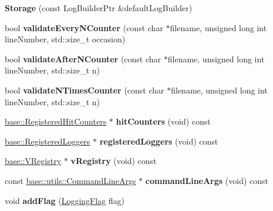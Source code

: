 \begin{DoxyCompactItemize}
\item 
\hypertarget{a00086_a4932a8f8a55c3b00467cf2feed6acf59}{}{\bfseries Storage} (const Log\+Builder\+Ptr \&default\+Log\+Builder)\label{a00086_a4932a8f8a55c3b00467cf2feed6acf59}

\item 
\hypertarget{a00086_ae99093b82b3f25b6baf5d3d8b00b27e5}{}bool {\bfseries validate\+Every\+N\+Counter} (const char $\ast$filename, unsigned long int line\+Number, std\+::size\+\_\+t occasion)\label{a00086_ae99093b82b3f25b6baf5d3d8b00b27e5}

\item 
\hypertarget{a00086_ad93b7ae53a58a57b85db2dfb310406c6}{}bool {\bfseries validate\+After\+N\+Counter} (const char $\ast$filename, unsigned long int line\+Number, std\+::size\+\_\+t n)\label{a00086_ad93b7ae53a58a57b85db2dfb310406c6}

\item 
\hypertarget{a00086_a141d7ef080be7eae11ac6201a538eec9}{}bool {\bfseries validate\+N\+Times\+Counter} (const char $\ast$filename, unsigned long int line\+Number, std\+::size\+\_\+t n)\label{a00086_a141d7ef080be7eae11ac6201a538eec9}

\item 
\hypertarget{a00086_accd5495cdad77254eb24ef8f75cd71ad}{}\hyperlink{a00071}{base\+::\+Registered\+Hit\+Counters} $\ast$ {\bfseries hit\+Counters} (void) const \label{a00086_accd5495cdad77254eb24ef8f75cd71ad}

\item 
\hypertarget{a00086_af0c2f1e119ac3f111f810a324b6b0d3a}{}\hyperlink{a00072}{base\+::\+Registered\+Loggers} $\ast$ {\bfseries registered\+Loggers} (void) const \label{a00086_af0c2f1e119ac3f111f810a324b6b0d3a}

\item 
\hypertarget{a00086_a1ec05ca060ff169569b6ea86da1e30da}{}\hyperlink{a00094}{base\+::\+V\+Registry} $\ast$ {\bfseries v\+Registry} (void) const \label{a00086_a1ec05ca060ff169569b6ea86da1e30da}

\item 
\hypertarget{a00086_a84f3d208bead8a8b2c15834be7f30f8d}{}const \hyperlink{a00009}{base\+::utils\+::\+Command\+Line\+Args} $\ast$ {\bfseries command\+Line\+Args} (void) const \label{a00086_a84f3d208bead8a8b2c15834be7f30f8d}

\item 
\hypertarget{a00086_a3e17c61961f3b2f45e8ec77e3320bed5}{}void {\bfseries add\+Flag} (\hyperlink{a00183_a2784aacd04cb7816ac1c0b20fcbf83cb}{Logging\+Flag} flag)\label{a00086_a3e17c61961f3b2f45e8ec77e3320bed5}


\end{DoxyCompactItemize}

